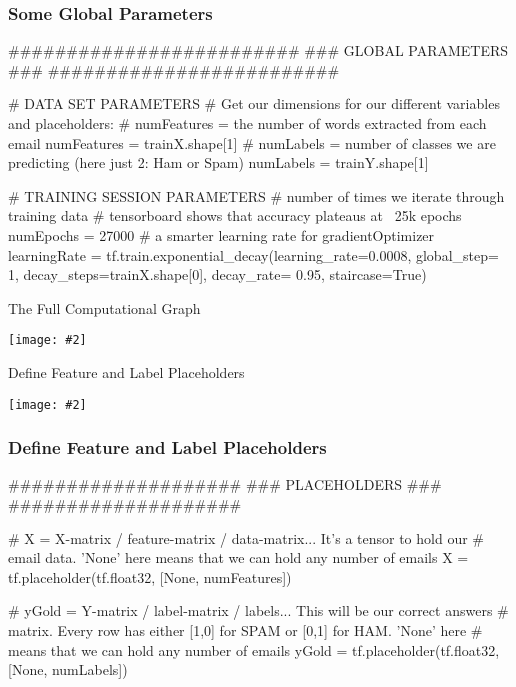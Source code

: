 \documentclass[14pt]{beamer}
\newcommand {\framedgraphic}[2] { %
    \begin{frame}{#1}
        \begin{center}
            \texttt{[image: \#2]}
        \end{center}
    \end{frame}
}
\begin{document}
\begin{frame}[fragile]
  \frametitle{Some Global Parameters}
  \begin{python}
#########################
### GLOBAL PARAMETERS ###
#########################

# DATA SET PARAMETERS
# Get our dimensions for our different variables and placeholders:
# numFeatures = the number of words extracted from each email
numFeatures = trainX.shape[1]
# numLabels = number of classes we are predicting (here just 2: Ham or Spam)
numLabels = trainY.shape[1]

# TRAINING SESSION PARAMETERS
# number of times we iterate through training data
# tensorboard shows that accuracy plateaus at ~25k epochs
numEpochs = 27000
# a smarter learning rate for gradientOptimizer
learningRate = tf.train.exponential_decay(learning_rate=0.0008,
                                          global_step= 1,
                                          decay_steps=trainX.shape[0],
                                          decay_rate= 0.95,
                                          staircase=True)
  \end{python}
\end{frame}



\framedgraphic{The Full Computational Graph}{full-graph.png}

\framedgraphic{Define Feature and Label Placeholders}{define-X-Y-matrices.png}

\begin{frame}[fragile]
  \frametitle{Define Feature and Label Placeholders}
  \begin{python}
####################
### PLACEHOLDERS ###
####################

# X = X-matrix / feature-matrix / data-matrix... It's a tensor to hold our
# email data. 'None' here means that we can hold any number of emails
X = tf.placeholder(tf.float32, [None, numFeatures])

# yGold = Y-matrix / label-matrix / labels... This will be our correct answers
# matrix. Every row has either [1,0] for SPAM or [0,1] for HAM. 'None' here 
# means that we can hold any number of emails
yGold = tf.placeholder(tf.float32, [None, numLabels])
  \end{python}
\end{frame}
\end{document}
